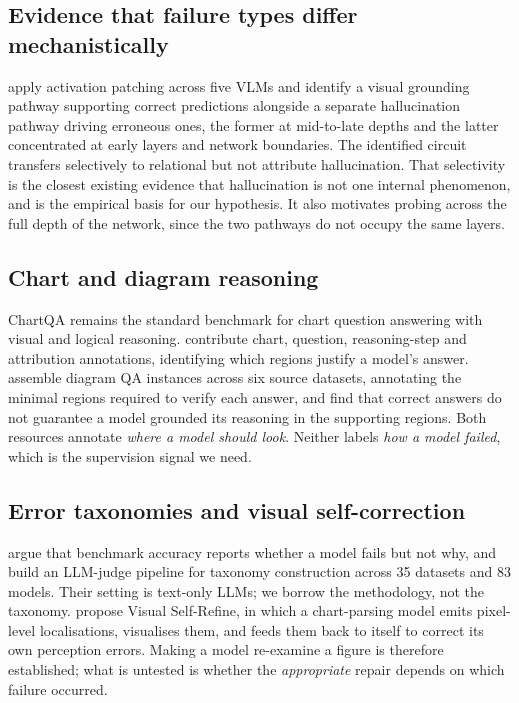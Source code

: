 \documentclass[11pt]{article}
\begin{document}
\subsection{Evidence that failure types differ mechanistically}
\citet{liu2026dualpathway} apply activation patching across five VLMs and
identify a visual grounding pathway supporting correct predictions alongside a
separate hallucination pathway driving erroneous ones, the former at
mid-to-late depths and the latter concentrated at early layers and network
boundaries. The identified circuit transfers selectively to relational but not
attribute hallucination. That selectivity is the closest existing evidence that
hallucination is not one internal phenomenon, and is the empirical basis for
our hypothesis. It also motivates probing across the full depth of the network,
since the two pathways do not occupy the same layers.

\subsection{Chart and diagram reasoning}
ChartQA \citep{masry2022chartqa} remains the standard benchmark for chart
question answering with visual and logical reasoning. \citet{rani2025radar}
contribute chart, question, reasoning-step and attribution annotations,
identifying which regions justify a model's answer.
\citet{iyengar2026dragon} assemble diagram QA instances across six source
datasets, annotating the minimal regions required to verify each answer, and
find that correct answers do not guarantee a model grounded its reasoning in the
supporting regions. Both resources annotate \emph{where a model should look}.
Neither labels \emph{how a model failed}, which is the supervision signal we
need.

\subsection{Error taxonomies and visual self-correction}
\citet{ashurytahan2026errormap} argue that benchmark accuracy reports whether a
model fails but not why, and build an LLM-judge pipeline for taxonomy
construction across 35 datasets and 83 models. Their setting is text-only LLMs;
we borrow the methodology, not the taxonomy. \citet{li2026visualselfrefine}
propose Visual Self-Refine, in which a chart-parsing model emits pixel-level
localisations, visualises them, and feeds them back to itself to correct its own
perception errors. Making a model re-examine a figure is therefore established;
what is untested is whether the \emph{appropriate} repair depends on which
failure occurred.
\end{document}
